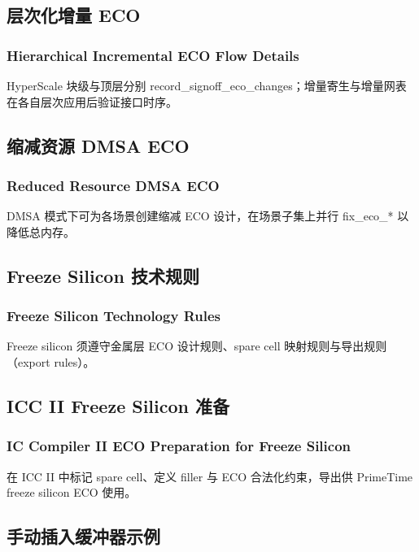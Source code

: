 \subsection{层次化增量 ECO}
\subsubsection*{Hierarchical Incremental ECO Flow Details}

HyperScale 块级与顶层分别 record_signoff_eco_changes；增量寄生与增量网表在各自层次应用后验证接口时序。

\subsection{缩减资源 DMSA ECO}
\subsubsection*{Reduced Resource DMSA ECO}

DMSA 模式下可为各场景创建缩减 ECO 设计，在场景子集上并行 fix_eco_* 以降低总内存。


\subsection{Freeze Silicon 技术规则}
\subsubsection*{Freeze Silicon Technology Rules}

Freeze silicon 须遵守金属层 ECO 设计规则、spare cell 映射规则与导出规则（export rules）。

\subsection{ICC II Freeze Silicon 准备}
\subsubsection*{IC Compiler II ECO Preparation for Freeze Silicon}

在 ICC II 中标记 spare cell、定义 filler 与 ECO 合法化约束，导出供 PrimeTime freeze silicon ECO 使用。

\subsection{手动插入缓冲器示例}
